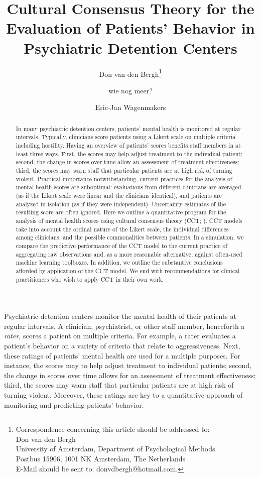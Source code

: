 \documentclass{article}
\title{Cultural Consensus Theory for the Evaluation of Patients’ Behavior in Psychiatric  Detention Centers}
\author[1]{Don van den Bergh\thanks{Correspondence concerning this article should be addressed to:  
\\  Don van den Bergh 
\\  University of Amsterdam, Department of Psychological Methods
\\  Postbus 15906, 1001 NK Amsterdam, The Netherlands
\\  E-Mail should be sent to: donvdbergh@hotmail.com.}}
\author[1]{wie nog meer?}
\author[1]{Eric-Jan Wagenmakers}
\affil[1]{University of Amsterdam}
\date{}
\begin{document}
\listoftodos
\newpage
\maketitle

\begin{abstract}
In many psychiatric detention centers, patients' mental health is monitored at regular intervals. Typically, clinicians score patients using a Likert scale on multiple criteria including hostility. Having an overview of patients’ scores benefits staff members in at least three ways. First, the scores may help adjust treatment to the individual patient; second, the change in scores over time allow an assessment of treatment effectiveness; third, the scores may warn staff that particular patients are at high risk of turning violent. Practical importance notwithstanding, current practices for the analysis of mental health scores are suboptimal: evaluations from different clinicians are averaged (as if the Likert scale were linear and the clinicians identical), and patients are analyzed in isolation (as if they were independent). Uncertainty estimates of the resulting score are often ignored. Here we outline a quantitative program for the analysis of mental health scores using cultural consensus theory (CCT; ). CCT models take into account the ordinal nature of the Likert scale, the individual differences among clinicians, and the possible commonalities between patients. In a simulation, we compare the predictive performance of the CCT model to the current practice of aggregating raw observations and, as a more reasonable alternative, against often-used machine learning toolboxes. In addition, we outline the substantive conclusions afforded by application of the CCT model. We end with recommendations for clinical practitioners who wish to apply CCT in their own work. 
\end{abstract}

\newpage


Psychiatric detention centers monitor the mental health of their patients at regular intervals. A clinician, psychiatrist, or other staff member, henceforth a \textit{rater}, scores a patient on multiple criteria. For example, a rater evaluates a patient's behavior on a variety of criteria that relate to aggressiveness. Next, these ratings of patients' mental health are used for a multiple purposes. For instance, the scores may to help adjust treatment to individual patients; second, the change in scores over time allows for an assessment of treatment effectiveness; third, the scores may warn staff that particular patients are at high risk of turning violent. Moreover, these ratings are key to a quantitative approach of monitoring and predicting patients' behavior.
\end{document}
